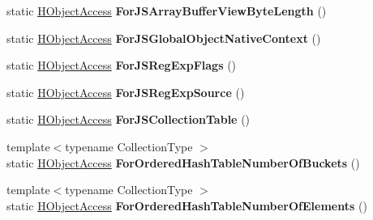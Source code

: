 \begin{DoxyCompactItemize}
\item 
static \hyperlink{classv8_1_1internal_1_1_h_object_access}{H\+Object\+Access} {\bfseries For\+J\+S\+Array\+Buffer\+View\+Byte\+Length} ()\hypertarget{classv8_1_1internal_1_1_h_object_access_a19fe3e98885ee7d8e661e57b32e583e4}{}\label{classv8_1_1internal_1_1_h_object_access_a19fe3e98885ee7d8e661e57b32e583e4}

\item 
static \hyperlink{classv8_1_1internal_1_1_h_object_access}{H\+Object\+Access} {\bfseries For\+J\+S\+Global\+Object\+Native\+Context} ()\hypertarget{classv8_1_1internal_1_1_h_object_access_ab51093735f84bac0b46b797a5f276d9b}{}\label{classv8_1_1internal_1_1_h_object_access_ab51093735f84bac0b46b797a5f276d9b}

\item 
static \hyperlink{classv8_1_1internal_1_1_h_object_access}{H\+Object\+Access} {\bfseries For\+J\+S\+Reg\+Exp\+Flags} ()\hypertarget{classv8_1_1internal_1_1_h_object_access_a435cf5e65cb034b2ac6e49bca37cdb2b}{}\label{classv8_1_1internal_1_1_h_object_access_a435cf5e65cb034b2ac6e49bca37cdb2b}

\item 
static \hyperlink{classv8_1_1internal_1_1_h_object_access}{H\+Object\+Access} {\bfseries For\+J\+S\+Reg\+Exp\+Source} ()\hypertarget{classv8_1_1internal_1_1_h_object_access_ad5fa97a4f246e24b38bcc344a3b53ac2}{}\label{classv8_1_1internal_1_1_h_object_access_ad5fa97a4f246e24b38bcc344a3b53ac2}

\item 
static \hyperlink{classv8_1_1internal_1_1_h_object_access}{H\+Object\+Access} {\bfseries For\+J\+S\+Collection\+Table} ()\hypertarget{classv8_1_1internal_1_1_h_object_access_a02e97210eef6f27b503d2f531e35fdf4}{}\label{classv8_1_1internal_1_1_h_object_access_a02e97210eef6f27b503d2f531e35fdf4}

\item 
{\footnotesize template$<$typename Collection\+Type $>$ }\\static \hyperlink{classv8_1_1internal_1_1_h_object_access}{H\+Object\+Access} {\bfseries For\+Ordered\+Hash\+Table\+Number\+Of\+Buckets} ()\hypertarget{classv8_1_1internal_1_1_h_object_access_ae15700986cc4778a5c46ba8472106d58}{}\label{classv8_1_1internal_1_1_h_object_access_ae15700986cc4778a5c46ba8472106d58}

\item 
{\footnotesize template$<$typename Collection\+Type $>$ }\\static \hyperlink{classv8_1_1internal_1_1_h_object_access}{H\+Object\+Access} {\bfseries For\+Ordered\+Hash\+Table\+Number\+Of\+Elements} ()\hypertarget{classv8_1_1internal_1_1_h_object_access_a921187da5cb181dcc8685fec16f1acd1}{}\label{classv8_1_1internal_1_1_h_object_access_a921187da5cb181dcc8685fec16f1acd1}


\end{DoxyCompactItemize}
